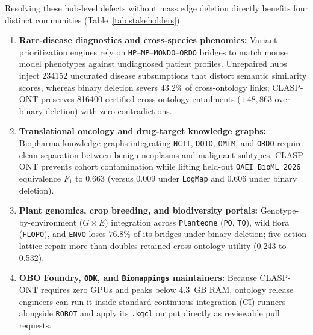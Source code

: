 \documentclass[10pt]{article}
\theoremstyle{accentdef}
\newcommand{\ClaspDiseasePhenotypeHubRawConsViol}{234152}
\newcommand{\ClaspDiseasePhenotypeHubBLexicalLatticeNovelCross}{816400}
\newcommand{\ClaspOAEIBioMLBLogMapRepairEquivFone}{0.009}
\newcommand{\ClaspOAEIBioMLBASPBinaryDeleteEquivFone}{0.606}
\newcommand{\ClaspOAEIBioMLBLexicalLatticeEquivFone}{0.663}
\newcommand{\ClaspPlantBiodivHubBASPBinaryDeleteRetention}{0.243}
\newcommand{\ClaspPlantBiodivHubBLexicalLatticeRetention}{0.532}
\begin{document}
Resolving these hub-level defects without mass edge deletion directly benefits four distinct communities (Table~\ref{tab:stakeholders}):
\begin{enumerate}
  \item \textbf{Rare-disease diagnostics and cross-species phenomics:} Variant-prioritization engines rely on \texttt{HP}--\texttt{MP}--\texttt{MONDO}--\texttt{ORDO} bridges to match mouse model phenotypes against undiagnosed patient profiles. Unrepaired hubs inject \num{\ClaspDiseasePhenotypeHubRawConsViol} uncurated disease subsumptions that distort semantic similarity scores, whereas binary deletion severs $43.2\%$ of cross-ontology links; \textsc{CLASP-ONT} preserves \num{\ClaspDiseasePhenotypeHubBLexicalLatticeNovelCross} certified cross-ontology entailments ($+48{,}863$ over binary deletion) with zero contradictions.
  \item \textbf{Translational oncology and drug-target knowledge graphs:} Biopharma knowledge graphs integrating \texttt{NCIT}, \texttt{DOID}, \texttt{OMIM}, and \texttt{ORDO} require clean separation between benign neoplasms and malignant subtypes. \textsc{CLASP-ONT} prevents cohort contamination while lifting held-out \texttt{OAEI\_BioML\_2026} equivalence $F_1$ to \ClaspOAEIBioMLBLexicalLatticeEquivFone{} (versus \ClaspOAEIBioMLBLogMapRepairEquivFone{} under \texttt{LogMap} and \ClaspOAEIBioMLBASPBinaryDeleteEquivFone{} under binary deletion).
  \item \textbf{Plant genomics, crop breeding, and biodiversity portals:} Genotype-by-environment ($G \times E$) integration across \texttt{Planteome} (\texttt{PO}, \texttt{TO}), wild flora (\texttt{FLOPO}), and \texttt{ENVO} loses $76.8\%$ of its bridges under binary deletion; five-action lattice repair more than doubles retained cross-ontology utility (\ClaspPlantBiodivHubBASPBinaryDeleteRetention{} to \ClaspPlantBiodivHubBLexicalLatticeRetention{}).
  \item \textbf{OBO Foundry, \texttt{ODK}, and \texttt{Biomappings} maintainers:} Because \textsc{CLASP-ONT} requires zero GPUs and peaks below $4.3$~GB RAM, ontology release engineers can run it inside standard continuous-integration (CI) runners alongside \texttt{ROBOT} and apply its \texttt{.kgcl} output directly as reviewable pull requests.
\end{enumerate}
\end{document}
